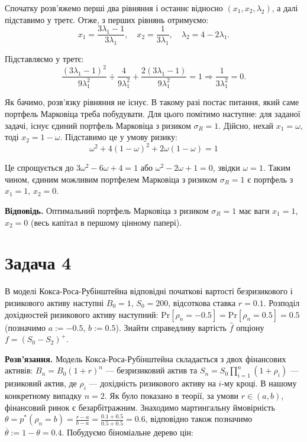 \documentclass{test_template}
\begin{document}
Спочатку розв'яжемо перші два рівняння і останнє відносно $(x_1,x_2,\lambda_2)$,
а далі підставимо у третє. Отже, з перших рівнянь отримуємо:
\begin{equation*}
    x_1 = \frac{3\lambda_1 - 1}{3\lambda_1}, \quad x_2 = \frac{1}{3\lambda_1}, \quad \lambda_2 = 4-2\lambda_1.
\end{equation*}

Підставляємо у третє:
\begin{equation*}
    \frac{(3\lambda_1-1)^2}{9\lambda_1^2} + \frac{4}{9\lambda_1^2} + \frac{2(3\lambda_1-1)}{9\lambda_1^2} = 1 \Rightarrow \frac{1}{3\lambda_1^2} = 0.
\end{equation*}

Як бачимо, розв'язку рівняння не існує. В такому разі постає питання, який саме
портфель Марковіца треба побудувати. Для цього помітимо наступне: для заданої
задачі, існує єдиний портфель Марковіца з ризиком $\sigma_R=1$. Дійсно, 
нехай $x_1=\omega$, тоді $x_2=1-\omega$. Підставимо це у умову ризику:
\begin{equation*}
    \omega^2 + 4(1-\omega)^2 + 2\omega(1-\omega) = 1
\end{equation*}

Це спрощується до $3\omega^2-6\omega+4=1$ або $\omega^2-2\omega+1=0$, 
звідки $\omega=1$. Таким чином, єдиним можливим портфелем Марковіца з ризиком
$\sigma_R=1$ є портфель з $x_1=1$, $x_2=0$.

\textbf{Відповідь.} Оптимальний портфель Марковіца з ризиком $\sigma_R=1$ має
ваги $x_1=1$, $x_2=0$ (весь капітал в першому цінному папері).

\newpage

\section{Задача 4}

\begin{problem}
    В моделі Кокса-Роса-Рубінштейна відповідні початкові вартості безризикового
і ризикового активу наступні $B_0=1$, $S_0=200$, відсоткова ставка $r=0.1$.
Розподіл дохідностей ризикового активу наступний:
$\text{Pr}[\rho_n=-0.5]=\text{Pr}[\rho_n=0.5]=0.5$ (позначимо $a:=-0.5$,
$b:=0.5$). Знайти справедливу вартість $\widehat{f}$ опціону $f=(S_0-S_2)^+$.
\end{problem}

\textbf{Розв'язання.} Модель Кокса-Роса-Рубінштейна складається з двох
фінансових активів: $B_n=B_0(1+r)^n$ --- безризиковий актив та
$S_n=S_0\prod_{i=1}^n (1+\rho_i)$ --- ризиковий актив, де $\rho_i$ ---
дохідність ризикового активу на $i$-му кроці. В нашому конкретному випадку
$n=2$. Як було показано в теорії, за умови $r \in (a,b)$, фінансовий ринок є
безарбітражним. Знаходимо мартингальну ймовірність
$\theta=p^*(\rho_n=b)=\frac{r-a}{b-a} = \frac{0.1+0.5}{0.5+0.5} = 0.6$,
відповідно також позначимо $\overline{\theta} := 1-\theta = 0.4$. Побудуємо
біноміальне дерево цін:
\end{document}
